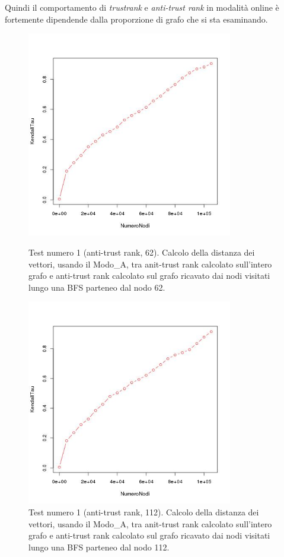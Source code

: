 Quindi il comportamento di \textit{trustrank} e \textit{anti-trust rank} in modalità online è fortemente dipendende dalla proporzione di grafo che si sta esaminando. 
  
 \begin{figure}
\centering
 \includegraphics[height=9cm]{immagini/test1/antiTrustrankTestMode0_62}
 \caption{Test numero 1 (anti-trust rank, 62). Calcolo della distanza dei vettori, usando il Modo\_A, tra anit-trust rank calcolato sull'intero grafo e anti-trust rank calcolato sul grafo ricavato dai nodi visitati lungo una BFS parteneo dal nodo 62.}
 \label{fig:test1antitrustModoA62}
\centering
 \includegraphics[height=9cm]{immagini/test1/antiTrustrankTestMode0_112}
 \caption{Test numero 1 (anti-trust rank, 112). Calcolo della distanza dei vettori, usando il Modo\_A, tra anit-trust rank calcolato sull'intero grafo e anti-trust rank calcolato sul grafo ricavato dai nodi visitati lungo una BFS parteneo dal nodo 112.}
 \label{fig:test1antitrustModoA112}
\end{figure}

